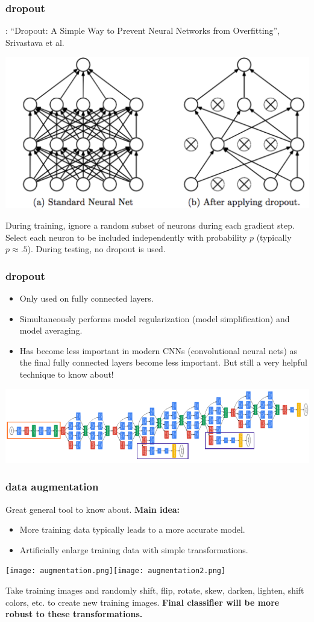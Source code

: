 \documentclass[handout,compress]{beamer}
\begin{document}
\begin{frame}
	\frametitle{dropout}
	\small
	: ``Dropout: A Simple Way to Prevent Neural Networks from
	Overfitting'', Srivastava et al.
	\begin{center}
		\includegraphics[width=.5\textwidth]{dropout.png}
	\end{center}
	During training, ignore a random subset of neurons during each gradient step. Select each neuron to be included independently with probability $p$ (typically $p \approx .5$). During testing, no dropout is used.
\end{frame}

\begin{frame}
	\frametitle{dropout}
	\small
	\begin{itemize}
		\item Only used on fully connected layers.
		\item Simultaneously performs model regularization (model simplification) and model averaging.
		\item Has become less important in modern CNNs (convolutional neural nets) as the final fully connected layers become less important. But still a very helpful technique to know about!
	\end{itemize}
	\begin{center}
	\includegraphics[width=.8\textwidth]{inception.png}
	\end{center}
\end{frame}


\begin{frame}
	\frametitle{data augmentation}
	\small
	Great general tool to know about. \textbf{Main idea:}
	\begin{itemize}
		\item More training data typically leads to a more accurate model.
		\item Artificially enlarge training data with simple transformations.
	\end{itemize}
\vspace{-1em}
	\begin{center}
	\texttt{[image: augmentation.png]}\texttt{[image: augmentation2.png]}
	\end{center}
\vspace{-1em}
Take training images and randomly shift, flip, rotate, skew, darken, lighten, shift colors, etc.  to create new training images. \textbf{Final classifier will be more robust to these transformations.}
\end{frame}
\end{document}
